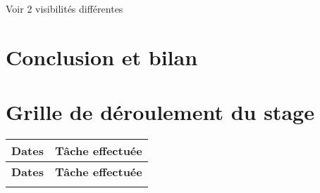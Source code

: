 \documentclass[a4paper,12pt,twoside,french]{article}
\begin{document}
Voir 2 visibilités différentes

\section{Conclusion et bilan}

\section{Grille de déroulement du stage}


\begin{longtable}[H]{| m{5cm} | m{10cm} |}
\hline
\textbf{Dates} & \textbf{Tâche effectuée}\\
\hline
\endfirsthead

\hline
\textbf{Dates} & \textbf{Tâche effectuée}\\
\hline
\endhead

\hline
\endfoot

\hline
\endlastfoot


\end{longtable}
\end{document}
